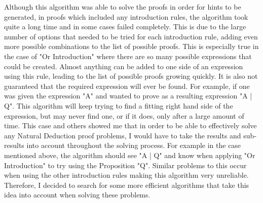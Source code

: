 Although this algorithm was able to solve the proofs in order for hints to be generated, in proofs which included any introduction rules, the algorithm took quite a long time and in some cases failed completely. This is due to the large number of options that needed to be tried for each introduction rule, adding even more possible combinations to the list of possible proofs. This is especially true in the case of "Or Introduction" where there are so many possible expressions that could be created. Almost anything can be added to one side of an expression using this rule, leading to the list of possible proofs growing quickly. It is also not guaranteed that the required expression will ever be found. For example, if one was given the expression "A" and wanted to prove as a resulting expression "A | Q". This algorithm will keep trying to find a fitting right hand side of the expression, but may never find one, or if it does, only after a large amount of time. This case and others showed me that in order to be able to effectively solve any Natural Deduction proof problems, I would have to take the results and sub-results into account throughout the solving process. For example in the case mentioned above, the algorithm should see "A | Q" and know when applying "Or Introduction" to try using the Proposition "Q". Similar problems to this occur when using the other introduction rules making this algorithm very unreliable. Therefore, I decided to search for some more efficient algorithms that take this idea into account when solving these problems.

